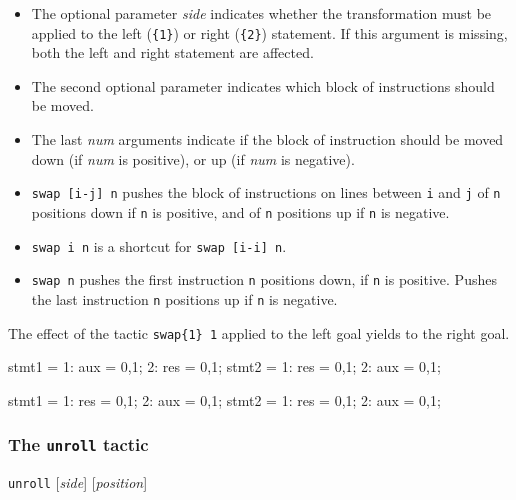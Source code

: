   \begin{itemize}
   \item The optional parameter \textit{side} indicates whether the
   transformation must be applied to the left (\verb+{1}+) or right
  (\verb+{2}+) statement. If this argument is missing, both the left and
  right statement are affected.
   \item The second optional parameter indicates which block of instructions
   should be moved.  
   \item The last \textit{num} arguments indicate if the block of instruction
   should be moved down (if \textit{num} is positive), or up 
   (if \textit{num} is negative).
   \item \verb+swap [i-j] n+ pushes the block of instructions on
     lines between \verb+i+ and \verb+j+ of \verb+n+ positions down if 
     \verb+n+ is positive, and of \verb+n+ positions up if \verb+n+
     is negative. 
   \item \verb+swap i n+ is a shortcut for \verb+swap [i-i] n+.
   \item \verb+swap n+ pushes the first instruction \verb+n+ positions down,
    if \verb+n+ is positive.  Pushes the last instruction \verb+n+ positions 
    up if \verb+n+ is negative.    
  \end{itemize}

\Example The effect of the tactic \verb+swap{1} 1+ applied to the 
left goal yields to the right goal.

\begin{minicode}{0.5}

stmt1 =   1: aux = {0,1};
          2: res = {0,1};
stmt2 =   1: res = {0,1};
          2: aux = {0,1};

\end{minicode}
\begin{minicode}{0.5}

stmt1 =   1: res = {0,1};
          2: aux = {0,1};
stmt2 =   1: res = {0,1};
          2: aux = {0,1};

\end{minicode}


\subsubsection{The \texttt{unroll} tactic}\label{tac:unroll} \DONE

\Syntax \verb+unroll+ [\textit{side}] [\textit{position}]

